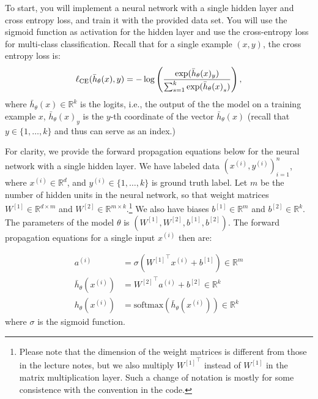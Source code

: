 To start, you will implement a neural network with a single hidden layer
and cross entropy loss, and train it with the provided data set. You will use the
sigmoid function as activation for the hidden layer and use the cross-entropy loss for multi-class classification. Recall that for a single example $(x, y)$, the cross
entropy loss is:
$$\ell_\textup{CE}(\bar{h}_{\theta}(x),y) = - \log\left(\frac{\exp(\bar{h}_{\theta}(x)_{y})}{\sum_{s=1}^{k}\exp({\bar{h}_{\theta}(x)}_s)}\right),$$
where $\bar{h}_{\theta}(x) \in \mathbb{R}^{k}$ is the logits, i.e., the output of the the model on a training example $x$, $\bar{h}_\theta(x)_y$ is the $y$-th coordinate of the vector $\bar{h}_\theta(x)$ (recall that $y\in \{1,\dots, k\}$ and thus can serve as an index.) %



For clarity, we provide the forward propagation equations below for the neural network with a single hidden layer. We have labeled data $(x^{(i)}, y^{(i)})_{i=1}^n$, where $x^{(i)} \in \mathbb{R}^d$, and $y^{(i)} \in \{1,\dots, k\}$ is ground truth label. Let $m$ be the number of hidden units in the neural network, so that weight matrices $W^{[1]} \in \mathbb{R}^{d \times m}$ and $W^{[2]} \in \mathbb{R}^{m \times k}$.\footnote{Please note that the dimension of the weight matrices is different from those in the lecture notes, but we also multiply ${W^{[1]}}^\top$ instead of $W^{[1]}$ in the matrix multiplication layer.  Such a change of notation is mostly for some consistence with the convention in the code.} We also have biases $b^{[1]} \in \mathbb{R}^m$ and $b^{[2]} \in \mathbb{R}^k$. The parameters of the model $\theta$ is $(W^{[1]},W^{[2]},b^{[1]},b^{[2]})$. The forward propagation equations for a single input $x^{(i)}$ then are:

\begin{align*}
  a^{(i)} &= \sigma \left( {W^{[1]}}^\top x^{(i)}  + b^{[1]} \right)  \in \mathbb{R}^m \\
  \bar{h}_{\theta}(x^{(i)})&= {W^{[2]}}^\top a^{(i)} + b^{[2]} \in \mathbb{R}^k \\
  {h}_{\theta}(x^{(i)}) &=  \mathrm{softmax}(\bar{h}_{\theta}(x^{(i)})) \in \mathbb{R}^k
\end{align*}
where $\sigma$ is the sigmoid function. 

